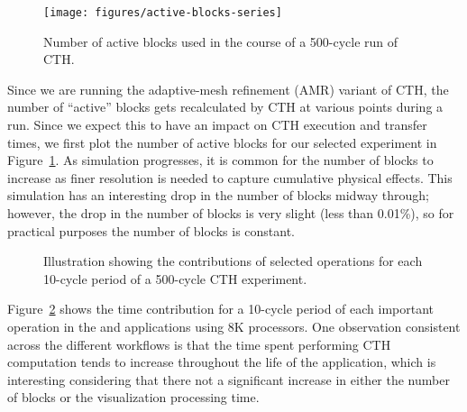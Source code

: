 \begin{figure}[tbp]
\begin{centering}
\texttt{[image: figures/active-blocks-series]}
\caption[Active Blocks]{Number of active blocks used in the course of a
500-cycle run of CTH.}
\label{fig:active-blocks}
\end{centering}
\end{figure}

Since we are running the adaptive-mesh refinement (AMR)
variant of CTH, the number of ``active'' blocks gets
recalculated by CTH at various points during a run. Since we expect this
to have an impact on CTH execution and \intransit transfer times, we first plot
the number of active blocks for our selected experiment in
Figure~\ref{fig:active-blocks}.  As simulation progresses, it is common for
the number of blocks to increase as finer resolution is needed to capture
cumulative physical effects.  This simulation has an interesting drop in
the number of blocks midway through; however, the drop in the number of
blocks is very slight (less than 0.01\%), so for practical purposes the
number of blocks is constant.


\begin{figure}[tbp]
\begin{centering}
\vspace{-24pt}

\vspace{-12pt}


\caption[Time-series plots of experiments.]{Illustration showing the
contributions of selected operations for each 10-cycle period of a 500-cycle
CTH experiment.
}
\label{fig:time-series}
\end{centering}
\end{figure}


Figure~\ref{fig:time-series} shows
the time contribution for a 10-cycle period of each important operation in the
\insitu and \intransit applications using 8K processors.  One observation
consistent across the different workflows is that the time spent performing
CTH computation tends to increase throughout the life of the application,
which is interesting considering that there not a significant increase in
either the number of blocks or the visualization processing time.

